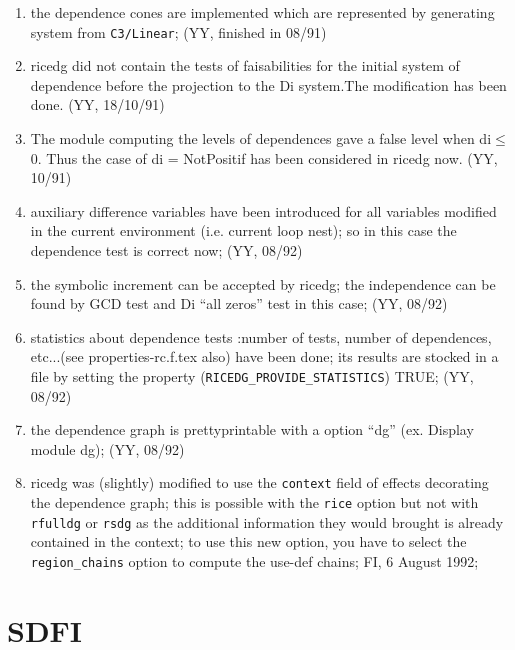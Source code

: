 \begin{enumerate}

  \item the dependence cones are implemented which are represented by 
        generating system from \verb+C3/Linear+; (YY, finished in 08/91)

  \item ricedg did not contain the tests of faisabilities for the
	initial system of dependence before the projection to the Di system.The
	modification has been done.  (YY, 18/10/91) 

  \item The module computing
	the levels of dependences gave a false level when di$\leq$0. 
	Thus the case
	of di = NotPositif has been considered in ricedg now.  (YY, 10/91)

  \item auxiliary difference variables have been introduced for all
	variables modified in the current environment (i.e. current
	loop nest); so in this case the dependence test is correct now;
        (YY, 08/92)

  \item the symbolic increment can be accepted by ricedg; the
        independence can be found by GCD test and Di ``all zeros'' test
        in this case; (YY, 08/92) 

  \item statistics 
	about dependence tests :number of tests, number of dependences, etc...(see
        properties-rc.f.tex also) have been done; its results are stocked
        in a file by setting the property (\verb+RICEDG_PROVIDE_STATISTICS+) TRUE;   
        (YY, 08/92)

  \item the dependence graph is prettyprintable with a option ``dg''
        (ex. Display module dg); (YY, 08/92)

  \item ricedg was (slightly) modified to use the \verb+context+ field 
	of effects decorating the dependence graph; this is possible
	with the \verb+rice+ option but not with \verb+rfulldg+ or
	\verb+rsdg+ as the additional information they would brought
	is already contained in the context; to use this new option,
	you have to select the  \verb+region_chains+ option to compute
	the use-def chains; FI, 6 August 1992;

\end{enumerate}

\section{SDFI}

